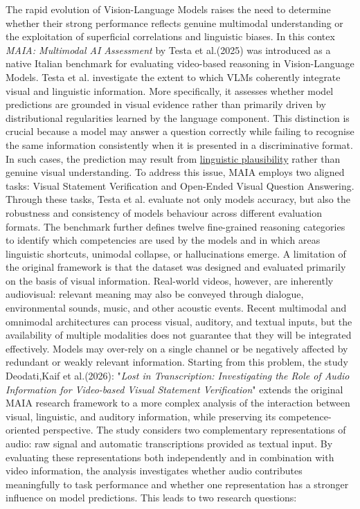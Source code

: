 

The rapid evolution of Vision-Language Models raises the need to determine whether their strong performance reflects genuine multimodal understanding 
or the exploitation of superficial correlations and linguistic biases. In this contex \textit{MAIA: Multimodal AI Assessment} by Testa et al.(2025)\cite{testa2025maia,testa2025allinone} was introduced as a native Italian 
benchmark for evaluating video-based reasoning in Vision-Language Models.
Testa et al. investigate the extent to which VLMs coherently integrate visual and linguistic information. More specifically, it assesses whether model predictions 
are grounded in visual evidence rather than primarily driven by distributional regularities learned by the language component. This distinction is crucial because 
a model may answer a question correctly while failing to recognise the same information consistently when it is presented in a discriminative format. In such cases,
the prediction may result from \underline{linguistic plausibility} rather than genuine visual understanding.
To address this issue, MAIA employs two aligned tasks: Visual Statement Verification and Open-Ended Visual Question Answering. 
Through these tasks, Testa et al. evaluate not only models accuracy, but also the robustness and consistency of models behaviour across different evaluation formats.
The benchmark further defines twelve fine-grained reasoning categories to identify which competencies are used by the models and in which areas linguistic shortcuts, 
unimodal collapse, or hallucinations emerge.
A limitation of the original framework is that the dataset was designed and evaluated primarily on the basis of visual information. 
Real-world videos, however, are inherently audiovisual: relevant meaning may also be conveyed through dialogue, environmental sounds, 
music, and other acoustic events. Recent multimodal and omnimodal architectures can process visual, auditory, and textual inputs, but the availability of 
multiple modalities does not guarantee that they will be integrated effectively. Models may over-rely on a single channel or be negatively affected by redundant 
or weakly relevant information.
Starting from this problem, the study Deodati,Kaif et al.(2026): "\textit{Lost in Transcription: Investigating the Role of Audio Information for Video-based Visual
Statement Verification}"\cite{deodati2026lost} extends the original MAIA research framework to a more complex analysis of the interaction between visual, linguistic, 
and auditory information, while preserving its competence-oriented perspective.
The study considers two complementary representations of audio: raw signal and automatic transcriptions provided as textual input. 
By evaluating these representations both independently and in combination with video information, the analysis investigates whether audio contributes 
meaningfully to task performance and whether one representation has a stronger influence on model predictions.
This leads to two research questions:

